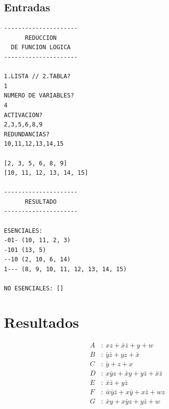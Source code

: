 \documentclass[11pt]{article}
\begin{document}
\subsection*{Entradas}
\label{sec:orgd815a60}
\begin{verbatim}
---------------------
      REDUCCION      
  DE FUNCION LOGICA  
---------------------

1.LISTA // 2.TABLA?
1
NUMERO DE VARIABLES?
4
ACTIVACION?
2,3,5,6,8,9
REDUNDANCIAS?
10,11,12,13,14,15

[2, 3, 5, 6, 8, 9]
[10, 11, 12, 13, 14, 15]

---------------------
      RESULTADO      
---------------------

ESENCIALES:
-01- (10, 11, 2, 3)
-101 (13, 5)
--10 (2, 10, 6, 14)
1--- (8, 9, 10, 11, 12, 13, 14, 15)

NO ESENCIALES: []
\end{verbatim}

\newpage

\section{Resultados}
\label{sec:org44d47ec}



\begin{equation}
  \begin{aligned}
    A &: ~ xz + \bar x \bar z + y + w \\
    B &: ~ \bar y \bar z + yz + \bar x \\
    C &: ~ \bar y + z + x \\
    D &: ~ x \bar y z + \bar x y + y \bar z + \bar x  \bar z \\
    E &: ~ \bar x \bar z + y \bar z \\
    F &: ~ \bar w \bar y \bar z + x \bar y + x \bar z + wz \\
    G &: ~ \bar x y + x \bar y z + y \bar z + w
  \end{aligned}
\end{equation}
\end{document}
